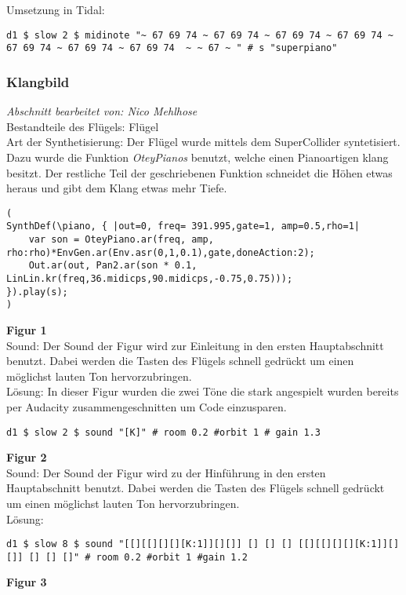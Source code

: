 \documentclass[
10pt, %
a4paper, %
oneside, %
headinclude,footinclude, %
BCOR5mm, %
]{scrartcl}
\begin{document}
\noindent Umsetzung in Tidal:
\begin{lstlisting}
d1 $ slow 2 $ midinote "~ 67 69 74 ~ 67 69 74 ~ 67 69 74 ~ 67 69 74 ~ 67 69 74 ~ 67 69 74 ~ 67 69 74  ~ ~ 67 ~ " # s "superpiano"
\end{lstlisting}


\subsubsection{Klangbild}
\textit{Abschnitt bearbeitet von: Nico Mehlhose}\\

\noindent Bestandteile des Flügels: Flügel\\
Art der Synthetisierung: Der Flügel wurde mittels dem SuperCollider syntetisiert. Dazu wurde die Funktion \textit{OteyPianos} benutzt, welche einen Pianoartigen klang besitzt. Der restliche Teil der geschriebenen Funktion schneidet die Höhen etwas heraus und gibt dem Klang etwas mehr Tiefe. 
\begin{lstlisting}
(
SynthDef(\piano, { |out=0, freq= 391.995,gate=1, amp=0.5,rho=1|
    var son = OteyPiano.ar(freq, amp, rho:rho)*EnvGen.ar(Env.asr(0,1,0.1),gate,doneAction:2);
    Out.ar(out, Pan2.ar(son * 0.1, LinLin.kr(freq,36.midicps,90.midicps,-0.75,0.75)));
}).play(s);
)
\end{lstlisting}
\noindent \textbf{Figur 1}\\
Sound: Der Sound der Figur wird zur Einleitung in den ersten Hauptabschnitt benutzt. Dabei werden die Tasten des Flügels 
schnell gedrückt um einen möglichst lauten Ton hervorzubringen.\\
Lösung: In dieser Figur wurden die zwei Töne die stark angespielt wurden bereits per Audacity zusammengeschnitten um Code einzusparen.
\begin{lstlisting}
d1 $ slow 2 $ sound "[K]" # room 0.2 #orbit 1 # gain 1.3
\end{lstlisting}
\noindent \textbf{Figur 2}\\
Sound: Der Sound der Figur wird zu der Hinführung in den ersten Hauptabschnitt benutzt. Dabei werden die Tasten des Flügels 
schnell gedrückt um einen möglichst lauten Ton hervorzubringen.\\
Lösung:
\begin{lstlisting}
d1 $ slow 8 $ sound "[[][[][][][K:1]][][]] [] [] [] [[][[][][][K:1]][][]] [] [] []" # room 0.2 #orbit 1 #gain 1.2
\end{lstlisting}
\noindent \textbf{Figur 3}\\
\end{document}
